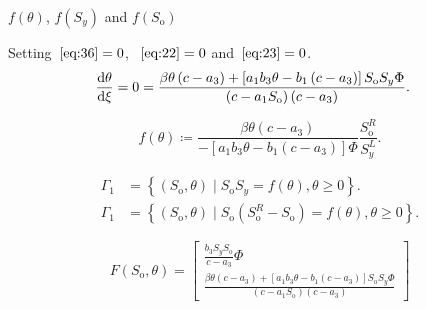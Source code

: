 \documentclass[
    8pt,
    aspectratio=1610,
    c,
    intlimits,
    leqno,
    professionalfonts,
]{beamer}
\begin{document}
\begin{frame}
	\frametitle{\secname}

	\begin{block}{$f\left(\theta\right)$,
			$f\left(S_{y}\right)$ and $f\left(S_{\text{o}}\right)$}

		Setting~$\eqref{eq:36}=0$, ~$\eqref{eq:22}=0$
		and~$\eqref{eq:23}=0$.
		\begin{align*}
			\diff{\theta}{\xi}=
			0
			 & =
			\frac{
				\beta\theta
				\left(c-a_{3}\right)+
				\left[
					a_{1}
					b_{3}
					\theta-
					b_{1}
					\left(c-a_{3}\right)
					\right]
				S_{\text{o}}
				S_{y}
				\Phi}{
				\left(c-a_{1}S_{\text{o}}\right)
				\left(c-a_{3}\right)
			}.
		\end{align*}

		\begin{equation*}
			f\left(\theta\right)\coloneqq
			\frac{
				\beta\theta\left(c-a_{3}\right)}{
				-\left[
					a_{1}
					b_{3}
					\theta-
					b_{1}
					\left(c-a_{3}\right)
					\right]
				\Phi
			}
			\frac{S^{R}_{\text{o}}}{S^{L}_{y}}.
		\end{equation*}

		\begin{align*}
			\Gamma_{1} & =
			\left\{
			\left(S_{\text{o}},\theta\right)\mid
			S_{\text{o}}
			S_{y}=
			f\left(\theta\right),\theta\geq0
			\right\}.      \\
			\Gamma_{1} & =
			\left\{
			\left(S_{\text{o}},\theta\right)\mid
			S_{\text{o}}
			\left(
			S^{R}_{\text{o}}-
			S_{\text{o}}
			\right)=
			f\left(\theta\right),\theta\geq0
			\right\}.
		\end{align*}

		\begin{equation*}
			F\left(S_{\text{o}},\theta\right)=
			\begin{bmatrix}
				\frac{b_{3}S_{y}S_{\text{o}}}{c-a_{3}}\Phi \\
				\frac{
					\beta\theta
					\left(c-a_{3}\right)+
					\left[
						a_{1}
						b_{3}
						\theta-
						b_{1}
						\left(c-a_{3}\right)
						\right]
					S_{\text{o}}
					S_{y}
					\Phi}{
					\left(c-a_{1}S_{\text{o}}\right)
					\left(c-a_{3}\right)
				}
			\end{bmatrix}
		\end{equation*}


\end{block}
\end{frame}
\end{document}
